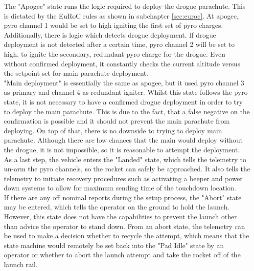\documentclass[fontsize=11pt,%
twoside,%
BCOR          = 8mm, %
DIV           = 11,  %
titlepage     = off,%
index=totoc,%
xcolor        = pdftex,%
dvipsnames,%
bibliography  = totoc,%
bibliography = numbered, %
listof        = notnumbered]{scrreprt}
\begin{document}
The "Apogee" state runs the logic required to deploy the drogue parachute. This is dictated by the EuRoC rules as shown in subchapter \ref{sec:euroc}. At apogee, pyro channel 1 would be set to high igniting the first set of pyro charges. Additionally, there is logic which detects drogue deployment. If drogue deployment is not detected after a certain time, pyro channel 2 will be set to high, to ignite the secondary, redundant pyro charge for the drogue. Even without confirmed deployment, it constantly checks the current altitude versus the setpoint set for main parachute deployment.\\
"Main deployment" is essentially the same as apogee, but it used pyro channel 3 as primary and channel 4 as redundant igniter. Whilst this state follows the pyro state, it is not necessary to have a confirmed drogue deployment in order to try to deploy the main parachute. This is due to the fact, that a false negative on the confirmation is possible and it should not prevent the main parachute from deploying. On top of that, there is no downside to trying to deploy main parachute. Although there are low chances that the main would deploy without the drogue, it is not impossible, so it is reasonable to attempt the deployment.\\
As a last step, the vehicle enters the "Landed" state, which tells the telemetry to un-arm the pyro channels, so the rocket can safely be approached. It also tells the telemetry to initiate recovery procedures such as activating a beeper and power down systems to allow for maximum sending time of the touchdown location.\\
If there are any off nominal reports during the setup process, the "Abort" state may be entered, which tells the operator on the ground to hold the launch. However, this state does not have the capabilities to prevent the launch other than advice the operator to stand down. From an abort state, the telemetry can be used to make a decision whether to recycle the attempt, which means that the state machine would remotely be set back into the "Pad Idle" state by an operator or whether to abort the launch attempt and take the rocket off of the launch rail.
\end{document}
